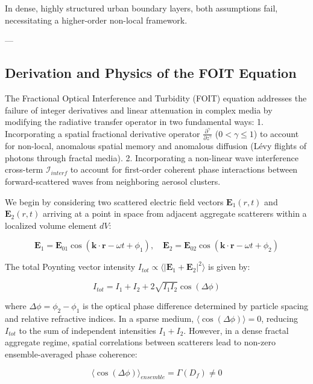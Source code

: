 \documentclass[12pt,a4paper]{article}
\begin{document}
In dense, highly structured urban boundary layers, both assumptions fail, necessitating a higher-order non-local framework.

---

\subsection{Derivation and Physics of the FOIT Equation}

The Fractional Optical Interference and Turbidity (FOIT) equation addresses the failure of integer derivatives and linear attenuation in complex media by modifying the radiative transfer operator in two fundamental ways:
1. Incorporating a spatial fractional derivative operator $\frac{\partial^\gamma}{\partial z^\gamma}$ ($0 < \gamma \le 1$) to account for non-local, anomalous spatial memory and anomalous diffusion (Lévy flights of photons through fractal media).
2. Incorporating a non-linear wave interference cross-term $\mathcal{I}_{interf}$ to account for first-order coherent phase interactions between forward-scattered waves from neighboring aerosol clusters.

We begin by considering two scattered electric field vectors $\mathbf{E}_1(r, t)$ and $\mathbf{E}_2(r, t)$ arriving at a point in space from adjacent aggregate scatterers within a localized volume element $dV$:

\begin{equation}
\mathbf{E}_1 = \mathbf{E}_{01} \cos(\mathbf{k} \cdot \mathbf{r} - \omega t + \phi_1), \quad \mathbf{E}_2 = \mathbf{E}_{02} \cos(\mathbf{k} \cdot \mathbf{r} - \omega t + \phi_2)
\end{equation}

The total Poynting vector intensity $I_{tot} \propto \langle |\mathbf{E}_1 + \mathbf{E}_2|^2 \rangle$ is given by:

\begin{equation}
I_{tot} = I_1 + I_2 + 2 \sqrt{I_1 I_2} \cos(\Delta \phi)
\end{equation}

where $\Delta \phi = \phi_2 - \phi_1$ is the optical phase difference determined by particle spacing and relative refractive indices. In a sparse medium, $\langle \cos(\Delta \phi) \rangle = 0$, reducing $I_{tot}$ to the sum of independent intensities $I_1 + I_2$. However, in a dense fractal aggregate regime, spatial correlations between scatterers lead to non-zero ensemble-averaged phase coherence:

\begin{equation}
\langle \cos(\Delta \phi) \rangle_{ensemble} = \Gamma(D_f) \neq 0
\end{equation}
\end{document}
